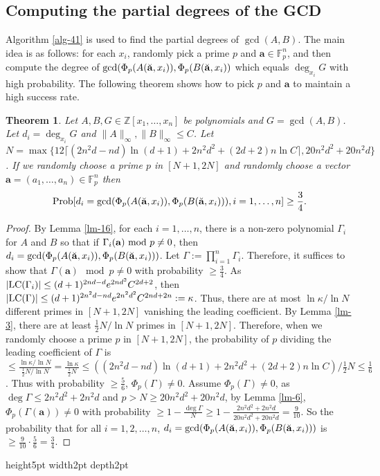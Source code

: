 \documentclass[final,20pt]{elsarticle}
\newtheorem{theorem}{Theorem}[section]
\def\Z{{\mathbb Z}}
\def\F{{\mathbb{F}}}
\def\LC{\hbox{\rm{LC}}}
\def\qed{\hfil {\vrule height5pt width2pt depth2pt}}
\begin{document}
\subsection{Computing the partial degrees of the GCD}\label{sec-4-2}
Algorithm \ref{alg-41} is used to find the partial degrees of $\gcd(A,B)$.
The main idea is as follows: for each $x_i$, randomly pick a prime $p$ and $\mathbf{a}\in \F_p^n$, and then compute the degree of $\gcd(\Phi_p(A(\Breve{\mathbf{a}},x_i)),\Phi_p(B(\Breve{\mathbf{a}},x_i))$ which equals $\deg_{x_i}G$ with high probability. The following theorem shows how to pick $p$ and ${\mathbf{a}}$ to maintain a high success rate.

\begin{theorem}\label{the-3}
Let $A,B,G\in \Z[x_1,\dots,x_n]$ be polynomials and $G=\gcd(A,B)$. Let $d_i=\deg_{x_i}G$ and $\|A\|_{\infty},\|B\|_{\infty}\leq C$. Let $N=\max\{ 12\lceil(2n^2d-nd)\ln(d+1)+2n^2d^2+(2d+2)n\ln C\rceil,20n^2d^2+20n^2d\}$. If we randomly choose a prime $p$ in $[N+1,2N]$ and randomly choose a vector $\mathbf{a}=(a_1,\dots,a_{n})\in \F_p^{n}$ then
$${\rm Prob}[d_i=\gcd(\Phi_p(A(\Breve{\mathbf{a}},x_i)),\Phi_p(B(\Breve{\mathbf{a}},x_i))),i=1,\dots,n]\geq \frac{3}{4}.$$
\end{theorem}
\begin{proof}
By Lemma \ref{lm-16}, for each $i=1,\dots,n$, there is a non-zero polynomial $\Gamma_i$ for $A$ and $B$ so that if $\Gamma_i(\mathbf{a}) ~{\rm mod}~ p\neq 0$, then  $d_i=\gcd(\Phi_p(A(\Breve{\mathbf{a}},x_i)),\Phi_p(B(\Breve{\mathbf{a}},x_i)))$. Let $\Gamma:=\prod_{i=1}^n\Gamma_i$. Therefore, it suffices to show that $\Gamma(\mathbf{a}) \mod p\neq 0$ with probability  $\geq \frac{3}{4}$.
%
As $|\LC(\Gamma_i)|\leq (d+1)^{2nd-d}e^{2nd^2}C^{2d+2}$, then $|\LC(\Gamma)|\leq (d+1)^{2n^2d-nd}e^{2n^2d^2}C^{2nd+2n}:=\kappa$. Thus, there are at most $\ln \kappa/\ln N$ different primes in $[N+1,2N]$ vanishing the leading coefficient.
%
By Lemma \ref{lm-3}, there are at least $\frac{1}{2}N/\ln N$ primes in $[N+1,2N]$.
%
Therefore, when we randomly choose a prime $p$ in $[N+1,2N]$, the probability of $p$ dividing the leading coefficient of $\Gamma$ is $\leq \frac{\ln \kappa/\ln N}{\frac{1}{2}N/\ln N}=\frac{\ln \kappa}{\frac{1}{2}N}\leq \left((2n^2d-nd)\ln(d+1)+2n^2d^2+(2d+2)n\ln C\right)/ \frac{1}{2}N\leq\frac16$.
%
Thus with probability $\geq \frac56$, $\Phi_p(\Gamma)\neq0$. Assume $\Phi_p(\Gamma)\neq0$, as $\deg \Gamma\leq 2n^2d^2+2n^2d$ and $p>N\geq 20n^2d^2+20n^2d$, by Lemma \ref{lm-6}, $\Phi_p(\Gamma(\mathbf{a}))\neq0$ with probability $\geq 1-\frac{\deg \Gamma}{N}\geq 1-\frac{2n^2d^2+2n^2d}{20n^2d^2+20n^2d}=\frac{9}{10}$.
%
So the probability that for all $i=1,2,\dots,n$, $d_i=\gcd(\Phi_p(A(\Breve{\mathbf{a}},x_i)),\Phi_p(B(\Breve{\mathbf{a}},x_i)))$ is $\geq \frac{9}{10}\cdot \frac{5}{6}=\frac{3}{4}$.

\end{proof}\qed
\end{document}
